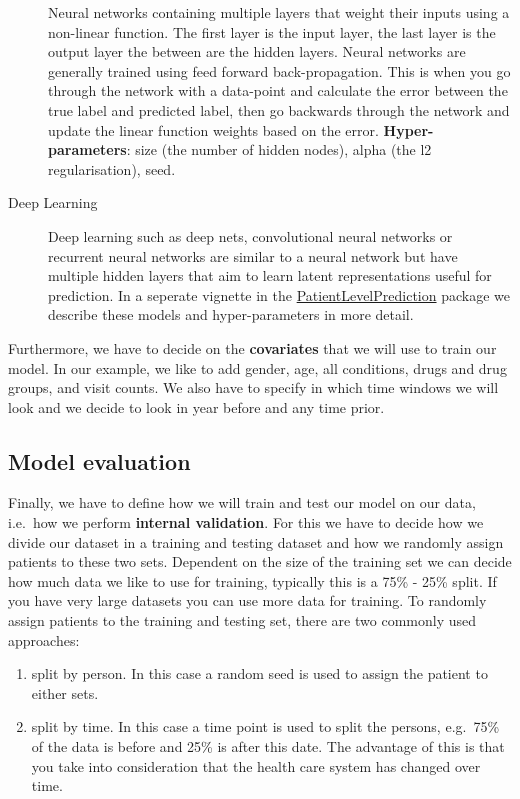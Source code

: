 \documentclass[]{book}
\providecommand{\tightlist}{%
  \setlength{\itemsep}{0pt}\setlength{\parskip}{0pt}}
\begin{document}
\begin{description}
Neural networks containing multiple layers that weight their inputs
using a non-linear function. The first layer is the input layer, the
last layer is the output layer the between are the hidden layers. Neural
networks are generally trained using feed forward back-propagation. This
is when you go through the network with a data-point and calculate the
error between the true label and predicted label, then go backwards
through the network and update the linear function weights based on the
error. \textbf{Hyper-parameters}: size (the number of hidden nodes),
alpha (the l2 regularisation), seed.
\item[Deep Learning]
Deep learning such as deep nets, convolutional neural networks or
recurrent neural networks are similar to a neural network but have
multiple hidden layers that aim to learn latent representations useful
for prediction. In a seperate vignette in the
\href{https://ohdsi.github.io/PatientLevelPrediction/}{PatientLevelPrediction}
package we describe these models and hyper-parameters in more detail.
\end{description}

Furthermore, we have to decide on the \textbf{covariates} that we will
use to train our model. In our example, we like to add gender, age, all
conditions, drugs and drug groups, and visit counts. We also have to
specify in which time windows we will look and we decide to look in year
before and any time prior.

\subsection{Model evaluation}\label{model-evaluation}

Finally, we have to define how we will train and test our model on our
data, i.e.~how we perform \textbf{internal validation}. For this we have
to decide how we divide our dataset in a training and testing dataset
and how we randomly assign patients to these two sets. Dependent on the
size of the training set we can decide how much data we like to use for
training, typically this is a 75\% - 25\% split. If you have very large
datasets you can use more data for training. To randomly assign patients
to the training and testing set, there are two commonly used approaches:

\begin{enumerate}
\def\labelenumi{\arabic{enumi}.}
\tightlist
\item
  split by person. In this case a random seed is used to assign the
  patient to either sets.
\item
  split by time. In this case a time point is used to split the persons,
  e.g.~75\% of the data is before and 25\% is after this date. The
  advantage of this is that you take into consideration that the health
  care system has changed over time.
\end{enumerate}
\end{document}
